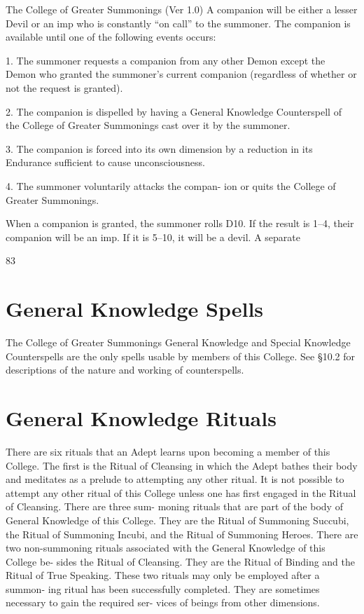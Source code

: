 \begin{Chapter}{The College of Greater Summonings (Ver 1.0)}
A companion will be either a lesser Devil or an imp who is constantly
“on call” to the summoner.  The companion is available until one of
the following events occurs:

1.  The  summoner  requests  a  companion  from  any 
other  Demon  except  the  Demon  who  granted  the 
summoner’s  current  companion  (regardless  of 
whether or not the request is granted). 

2. The companion is dispelled by having a General 
Knowledge Counterspell of the College of  Greater 
Summonings cast over it by the summoner. 

3. The companion is forced into its own dimension 
by a reduction in its Endurance sufficient to cause 
unconsciousness. 

4.  The  summoner  voluntarily  attacks  the  compan-
ion or quits the College of Greater Summonings. 

When a companion is granted, the summoner rolls 
D10.  If  the  result  is  1–4,  their  companion  will  be 
an imp. If it is 5–10, it will be a devil. A separate 

83 

\section{General Knowledge Spells}

The College of Greater Summonings General Knowledge and Special
Knowledge Counterspells are the only spells usable by members of this
College.  See §10.2 for descriptions of the nature and working of
counterspells.

\section{General Knowledge Rituals}


There  are  six  rituals  that  an  Adept  learns  upon 
becoming a member of this College. The first is the 
Ritual of Cleansing in which the Adept bathes their 
body and meditates as a prelude to attempting any 
other  ritual.  It  is  not  possible  to  attempt  any  other 
ritual  of  this  College  unless  one  has  first  engaged 
in  the  Ritual  of  Cleansing.  There  are  three  sum-
moning rituals that are part of the body of General 
Knowledge  of this College. They are the Ritual of 
Summoning  Succubi,  the  Ritual  of  Summoning 
Incubi,  and  the  Ritual  of  Summoning  Heroes. 
There  are  two  non-summoning  rituals  associated 
with  the  General  Knowledge  of  this  College  be-
sides  the  Ritual  of  Cleansing.  They  are  the  Ritual 
of Binding and the Ritual of True Speaking. These 
two rituals may only be employed after a summon-
ing  ritual  has  been  successfully  completed.  They 
are  sometimes  necessary  to  gain  the  required  ser-
vices of beings from other dimensions. 


\end{Chapter}
